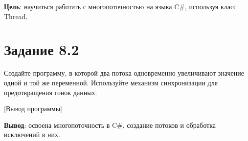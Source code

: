 \documentclass{bsuir}
\newcommand{\csharp}{C{\liberationrm\#}}
\begin{document}
\maketitle
\mainmatter


\textbf{Цель}: научиться работать с многопоточностью на языка \csharp,
используя класс Thread.

\section*{Задание 8.2}

Создайте программу, в которой два потока одновременно увеличивают значение
одной и той же переменной. Используйте механизм синхронизации для
предотвращения гонок данных.


[Вывод программы]

\textbf{Вывод}: освоена многопоточность в \csharp, создание потоков и
обработка исключений в них.
\end{document}
